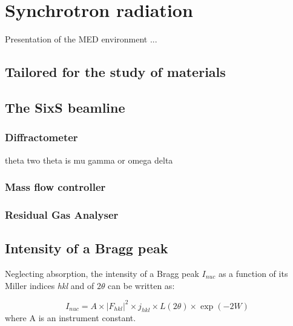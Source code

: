 \section{Synchrotron radiation} \label{SIXS}

Presentation of the MED environment ... 

\subsection{Tailored for the study of materials}

\subsection{The SixS beamline}

\subsubsection{Diffractometer}
theta two theta is mu gamma or omega delta

\subsubsection{Mass flow controller}

\subsubsection{Residual Gas Analyser}


\subsection{Intensity of a Bragg peak}
Neglecting absorption, the intensity of a Bragg peak $I_{nuc}$ as a function of its Miller indices \textit{hkl} and of $2\theta$ can be written as:

\begin{equation}
    \label{eq:PeakIntensity}
    I_{nuc} = A \times |F_{hkl}|^2  \times j_{hkl} \times L(2\theta) \times \exp{(-2W)}
\end{equation}
where A is an instrument constant.

